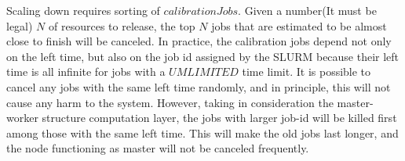Scaling down requires sorting of  $calibrationJobs$. Given a number(It must be legal) $ N $ of resources to release, the top $ N $ jobs that are estimated to be almost close to finish will be canceled.
In practice, the calibration jobs depend not only on the left time, but also on the job id assigned by the SLURM because their left time is all infinite for jobs with a $UMLIMITED$ time limit.
It is possible to cancel any jobs with the same left time randomly, and in principle, this will not cause any harm to the system.
However, taking in consideration the master-worker structure computation layer, the jobs with larger job-id will be killed first among those with the same left time.
This will make the old jobs last longer, and the node functioning as master will not be canceled frequently.








